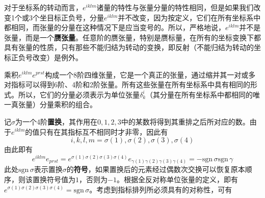 对于坐标系的转动而言，$e^{iklm}$诸量的特性与张量分量的特性相同，但是如果我们改变1个或3个坐目标正负号，分量$e^{iklm}$并不改变，因为按定义，它们在所有坐标系中都相同，而张量的分量在这种情况下是应当变号的。所以，严格地说，$e^{iklm}$并不是张量，而是一个{\bf 赝张量}。任意阶的赝张量，特别是赝标量，在所有的坐标变换下都具有张量的性质，只有那些不能归结为转动的变换，即反射（不能归结为转动的坐标正负号改变）是例外。

乘积$e^{iklm}e^{prst}$构成一个8阶四维张量，它是一个真正的张量，通过缩并其一对或多对指标可以得到6阶、4阶和2阶张量。所有这些张量在所有坐标系中具有相同的形式。所以，它们的分量必须表示为单位张量$\delta^i_k$（其分量在所有坐标系中都相同的唯一真张量）分量乘积的组合。%

记$\sigma$为一个4阶{\bf 置换}，其作用在$0,1,2,3$中的某数将得到其重排之后所对应的数。由于$e^{iklm}$的值只有在其指标互不相同时才非零，因此有
\begin{equation*}
	i,k,l,m = \sigma(1),\sigma(2),\sigma(3),\sigma(4)
\end{equation*}
由此即有
\begin{equation*}
	e^{iklm}e_{prst} = e^{\sigma(1)\sigma(2)\sigma(3)\sigma(4)} e_{\gamma(1)\gamma(2)\gamma(3)\gamma(4)} = -\mathrm{sgn}\,\sigma \mathrm{sgn}\,\gamma
\end{equation*}
此处$\mathrm{sgn}\,\sigma$表示置换$\sigma$的{\bf 符号}，如果置换后的元素经过偶数次交换可以恢复原本顺序，则该置换符号值为$1$，否则为$-1$。根据全反对称单位张量的定义，即有$e^{\sigma(1)\sigma(2)\sigma(3)\sigma(4)} = \mathrm{sgn}\,\sigma$。考虑到指标排列所必须具有的对称性，可有
